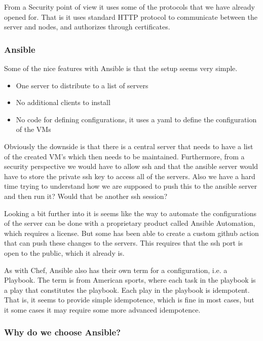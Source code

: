 From a Security point of view it uses some of the protocols that we have already opened for. That is it uses standard HTTP protocol to communicate between the server and nodes, and authorizes through certificates.

\subsubsection{Ansible}

Some of the nice features with Ansible is that the setup seems very simple.

\begin{itemize}
    \item One server to distribute to a list of servers
    \item No additional clients to install
    \item No code for defining configurations, it uses a yaml to define the configuration of the VMs
\end{itemize}

Obviously the downside is that there is a central server that needs to have a list of the created VM’s which then needs to be maintained. Furthermore, from a security perspective we would have to allow ssh and that the ansible server would have to store the private ssh key to access all of the servers. Also we have a hard time trying to understand how we are supposed to push this to the ansible server and then run it? Would that be another ssh session?

Looking a bit further into it is seems like the way to automate the configurations of the server can be done with a proprietary product called Ansible Automation, which requires a license. But some has been able to create a custom github action that can push these changes to the servers. This requires that the ssh port is open to the public, which it already is.

As with Chef, Ansible also has their own term for a configuration, i.e. a Playbook. The term is from American sports, where each task in the playbook is a play that constitutes the playbook. Each play in the playbook is idempotent. That is, it seems to provide simple idempotence, which is fine in most cases, but it some cases it may require some more advanced idempotence.

\subsubsection{Why do we choose Ansible?}

